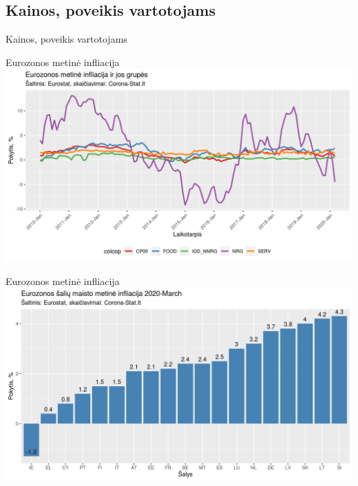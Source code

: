 \documentclass[aspectratio=169, 11pt]{beamer}
\begin{document}

\subsection{Kainos, poveikis vartotojams}

\begin{frame}
\begin{LARGE}
Kainos, poveikis vartotojams
\end{LARGE}
\end{frame}

\begin{frame}{Eurozonos metinė infliacija}
\centering
\includegraphics[scale=0.575]{infliacija_ez.png}
\end{frame}

\begin{frame}{Eurozonos metinė infliacija}
\centering
\includegraphics[scale=0.575]{infliacija_maistas.png}
\end{frame}
\end{document}
